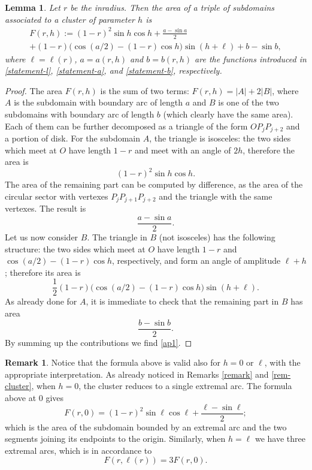 \documentclass[JEP,XML,SOM,Unicode,NoFloatCountersInSection]{cedram}
\theoremstyle{plain}
\newtheorem{lemma}[theorem]{Lemma}
\theoremstyle{definition}
\newtheorem{remark}[theorem]{Remark}
\begin{document}
\begin{lemma}\label{lem-F} Let $r$ be the inradius. Then the area of a triple of subdomains associated to a cluster of parameter $h$ is
\begin{multline}\label{ap1}
F(r,h):=(1-r)^2 \sin h \cos h +\frac{a-\sin a}{2}\\
+(1-r) \bigl(\cos(a/2)-(1-r)\cos h\bigr) \sin(h+\ell) +b-\sin b,
\end{multline}
where $\ell=\ell(r)$, $a=a(r,h)$ and $b=b(r,h)$ are the functions introduced in \eqref{statement-l}, \eqref{statement-a}, and \eqref{statement-b}, respectively.
\end{lemma}
\begin{proof} The area $F(r,h)$ is the sum of two terms: $F(r,h)=|A|+2|B|$, where $A$ is the subdomain with boundary arc of length $a$ and $B$ is one of the two subdomains with boundary arc of length $b$ (which clearly have the same area).
Each of them can be further decomposed as a triangle of the form $OP_jP_{j+2}$ and a portion of disk.
For the subdomain $A$, the triangle is isosceles: the two sides which meet at $O$ have length $1-r$ and meet with an angle of $2h$, therefore the area is
\[
(1-r)^2\sin h \cos h.
\]
The area of the remaining part can be computed by difference, as the area of the circular sector with vertexes $P_jP_{j+1}P_{j+2}$ and the triangle with the same vertexes. The result is
\[
\frac{a-\sin a}{2}.
\]
Let us now consider $B$. The triangle in $B$ (not isosceles) has the following structure: the two sides which meet at $O$ have length $1-r$ and $\cos(a/2) - (1-r)\cos h$, respectively, and form an angle of amplitude $\ell + h$; therefore its area is
\[
\frac12 (1-r) \big(\cos(a/2)-(1-r)\cos h\big) \sin(h+\ell).
\]
As already done for $A$, it is immediate to check that the remaining part in $B$ has area
\[
\frac{b-\sin b}{2}.
\]
By summing up the contributions we find \eqref{ap1}. \end{proof}
\begin{remark}\label{maybe}
Notice that the formula above is valid also for $h= 0 $ or $\ell$, with the appropriate interpretation. As already noticed in Remarks \ref{remark} and \ref{rem-cluster}, when $h=0$, the cluster reduces to a single extremal arc. The formula above at 0 gives
\[
F(r,0)=(1-r)^2\sin \ell \cos\ell + \frac{\ell - \sin \ell}{2};
\]
which is the area of the subdomain bounded by an extremal arc and the two segments joining its endpoints to the origin.
Similarly, when $h=\ell$ we have three extremal arcs, which is in accordance to
\[
F(r,\ell(r))=3F(r,0).
\]
\end{remark}
\end{document}
